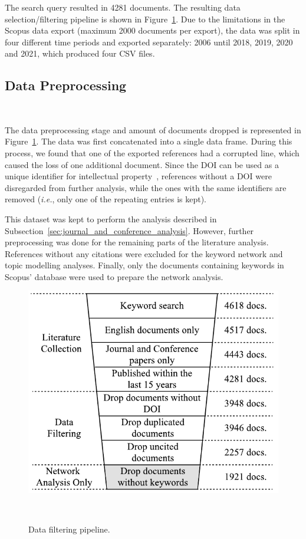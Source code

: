 \documentclass[parskip=full]{scrartcl}
\begin{document}
The search query resulted in 4281 documents. The resulting data
selection/filtering pipeline is shown in
Figure~\ref{fig:data_filtering_pipeline}. Due to the limitations in the Scopus
data export (maximum 2000 documents per export), the data was split in four
different time periods and exported separately: 2006 until 2018, 2019, 2020
and 2021, which produced four CSV files.

\subsection{Data Preprocessing}~\label{sec:data_preprocessing}

The data preprocessing stage and amount of documents dropped is represented in
Figure~\ref{fig:data_filtering_pipeline}. The data was first concatenated into
a single data frame. During this process, we found that one of the exported
references had a corrupted line, which caused the loss of one additional
document.  Since the DOI can be used as a unique identifier for intellectual
property~\cite{Paskin1999}, references without a DOI were disregarded from
further analysis, while the ones with the same identifiers are removed
(\textit{i.e.}, only one of the repeating entries is kept).

This dataset was kept to perform the analysis described in
Subsection~\ref{sec:journal_and_conference_analysis}. However, further
preprocessing was done for the remaining parts of the literature analysis.
References without any citations were excluded for the keyword network and
topic modelling analyses. Finally, only the documents containing keywords in
Scopus' database were used to prepare the network analysis.

\begin{figure}[H]
	\centering
    \includegraphics[width=.55\linewidth]{../analysis/data_filtering_pipeline}
    \caption{Data filtering pipeline.
    }~\label{fig:data_filtering_pipeline}
\end{figure}
\end{document}
